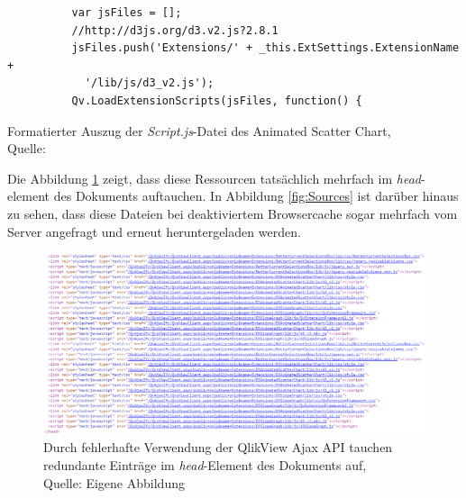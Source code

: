 \begin{appendix}
\begin{listing}[htbp]
\begin{verbatim}
          var jsFiles = [];
          //http://d3js.org/d3.v2.js?2.8.1
          jsFiles.push('Extensions/' + _this.ExtSettings.ExtensionName +
            '/lib/js/d3_v2.js');
          Qv.LoadExtensionScripts(jsFiles, function() {
\end{verbatim}
\caption[Formatierter Auszug der \textit{Script.js}-Datei des Animated Scatter Chart]{Formatierter Auszug der \textit{Script.js}-Datei des Animated Scatter Chart, \\Quelle: \cite{QlikViewExtensionAnimatedScatterChartSourceCode}}
\label{lst:AnimatedScatterChartScriptJsDatei}
\end{listing}\fi

Die Abbildung \ref{fig:endOfHead} zeigt, dass diese Ressourcen tatsächlich mehrfach im \textit{head}-element des Dokuments auftauchen. In Abbildung \ref{fig:Sources} ist darüber hinaus zu sehen, dass diese Dateien bei deaktiviertem Browsercache sogar mehrfach vom Server angefragt und erneut heruntergeladen werden.

\ifIncludeFigures\begin{figure}[htbp]
	\centering
		\includegraphics[width=1.00\textwidth]{img/headRudundant/endOfHead.PNG}
	\caption[Redundante Einträge im \textit{head}-Element des Dokuments]{Durch fehlerhafte Verwendung der QlikView Ajax API tauchen redundante Einträge im \textit{head}-Element des Dokuments auf, \\Quelle: Eigene Abbildung}
	\label{fig:endOfHead}
\end{figure}\fi


\end{appendix}
